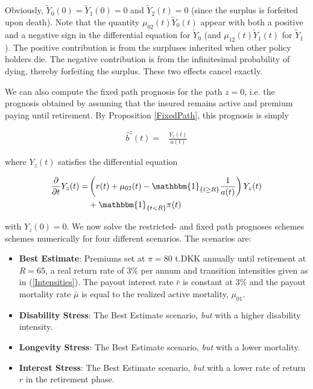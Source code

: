 \documentclass{article}
\newcommand{\1}[1]{\mathbbm{1}_{\left\lbrace #1 \right\rbrace}}
\theoremstyle{break}
\theoremstyle{remark}
\numberwithin{equation}{section}
\begin{document}
Obviously, $\tilde{Y}_0(0)=\tilde{Y}_1(0)=0$ and $\tilde{Y}_2(t)=0$ (since the surplus is forfeited upon death). Note that the quantity $\mu_{02}(t) \tilde{Y}_0(t)$ appear with both a positive and a negative sign in the differential equation for $\tilde{Y}_0$ (and $\mu_{12}(t) \tilde{Y}_1(t)$ for $\tilde{Y}_1$). The positive contribution is from the surpluses inherited when other policy holders die. The negative contribution is from the infinitesimal probability of dying, thereby forfeiting the surplus. These two effects cancel exactly.

We can also compute the fixed path prognosis for the path $z=0$, i.e. the prognosis obtained by assuming that the insured remains active and premium paying until retirement.  By Proposition \ref{FixedPath}, this prognosis is simply

\begin{align} \label{Naja2}
	\hat{b}^z(t) =& \frac{Y_z(t)}{a(t)}
\end{align}

where $Y_z(t)$ satisfies the differential equation

\begin{align} \label{Jaja2}
\begin{split}
		\frac{\partial}{\partial t}Y_z(t) =& \left( r(t) + \mu_{02}(t) - \1{t \geq R} \frac{1}{a(t)}\right) Y_z(t) \\
	&+ \1{t<R} \pi(t)
\end{split}
\end{align}

with $Y_z(0) = 0$. We now solve the restricted- and fixed path prognoses schemes schemes numerically for four different scenarios. The scenarios are:

\begin{itemize}
	\item \textbf{Best Estimate}: Premiums set at $\pi = 80$ t.DKK annually until retirement at $R=65$, a real return rate of 3\% per annum and transition intensities given as in (\ref{Intensities}). The payout interest rate $\bar{r}$ is constant at 3\% and the payout mortality rate $\bar{\mu}$ is equal to the realized active mortality, $\mu_{01}$.
	\item \textbf{Disability Stress}: The Best Estimate scenario, \textit{but} with a higher disability intensity.
	\item \textbf{Longevity Stress}: The Best Estimate scenario, \textit{but} with a lower mortality.
	\item \textbf{Interest Stress}: The Best Estimate scenario, \textit{but} with a lower rate of return $r$ in the retirement phase.
\end{itemize}
\end{document}
